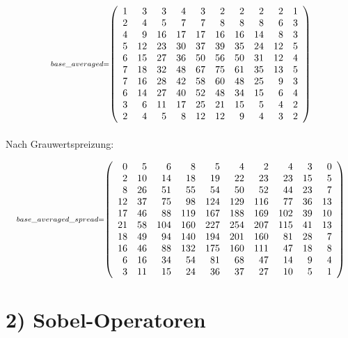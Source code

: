 \documentclass[11pt]{article}
\begin{document}
    
    \[\scriptstyle base\_averaged =  \def\g{\color{lightgray}}\left(\begin{array}{rrrrrrrrrr}1 & 3 & 3 & 4 & 3 & 2 & 2 & 2 & 2 & 1\\2 & 4 & 5 & 7 & 7 & 8 & 8 & 8 & 6 & 3\\4 & 9 & 16 & 17 & 17 & 16 & 16 & 14 & 8 & 3\\5 & 12 & 23 & 30 & 37 & 39 & 35 & 24 & 12 & 5\\6 & 15 & 27 & 36 & 50 & 56 & 50 & 31 & 12 & 4\\7 & 18 & 32 & 48 & 67 & 75 & 61 & 35 & 13 & 5\\7 & 16 & 28 & 42 & 58 & 60 & 48 & 25 & 9 & 3\\6 & 14 & 27 & 40 & 52 & 48 & 34 & 15 & 6 & 4\\3 & 6 & 11 & 17 & 25 & 21 & 15 & 5 & 4 & 2\\2 & 4 & 5 & 8 & 12 & 12 & 9 & 4 & 3 & 2\end{array}\right)\]

    
    \newpage
    \paragraph{}
    Nach Grauwertspreizung:
    
    \[\scriptstyle base\_averaged\_spread =  \def\g{\color{lightgray}}\left(\begin{array}{rrrrrrrrrr}0 & 5 & 6 & 8 & 5 & 4 & 2 & 4 & 3 & 0\\2 & 10 & 14 & 18 & 19 & 22 & 23 & 23 & 15 & 5\\8 & 26 & 51 & 55 & 54 & 50 & 52 & 44 & 23 & 7\\12 & 37 & 75 & 98 & 124 & 129 & 116 & 77 & 36 & 13\\17 & 46 & 88 & 119 & 167 & 188 & 169 & 102 & 39 & 10\\21 & 58 & 104 & 160 & 227 & 254 & 207 & 115 & 41 & 13\\18 & 49 & 94 & 140 & 194 & 201 & 160 & 81 & 28 & 7\\16 & 46 & 88 & 132 & 175 & 160 & 111 & 47 & 18 & 8\\6 & 16 & 34 & 54 & 81 & 68 & 47 & 14 & 9 & 4\\3 & 11 & 15 & 24 & 36 & 37 & 27 & 10 & 5 & 1\end{array}\right)\]

    
    \hypertarget{sobel-operatoren}{%
\section*{2) Sobel-Operatoren}\label{sobel-operatoren}}
\end{document}
